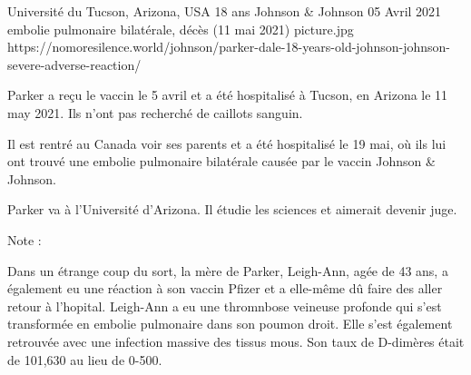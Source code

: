           {Université du Tucson, Arizona, USA}
          {18 ans}
          {Johnson \& Johnson}
          {05 Avril 2021}
          {embolie pulmonaire bilatérale, décès (11 mai 2021)}
          {picture.jpg}
          {https://nomoresilence.world/johnson/parker-dale-18-years-old-johnson-johnson-severe-adverse-reaction/}
          {

Parker a reçu le vaccin le 5 avril et a été hospitalisé à Tucson, en Arizona le
11 may 2021. Ils n'ont pas recherché de caillots sanguin.

Il est rentré au Canada voir ses parents et a été hospitalisé le 19 mai, où ils
lui ont trouvé une embolie pulmonaire bilatérale causée par le vaccin
Johnson \& Johnson.

Parker va à l'Université d'Arizona. Il étudie les sciences et aimerait devenir
juge.

Note :

Dans un étrange coup du sort, la mère de Parker, Leigh-Ann, agée de 43 ans, a
également eu une réaction à son vaccin Pfizer et a elle-même dû faire des aller
retour à l'hopital. Leigh-Ann a eu une thromnbose veineuse profonde qui s'est
transformée en embolie pulmonaire dans son poumon droit. Elle s'est également
retrouvée avec une infection massive des tissus mous. Son taux de D-dimères
était de 101,630 au lieu de 0-500.

}
